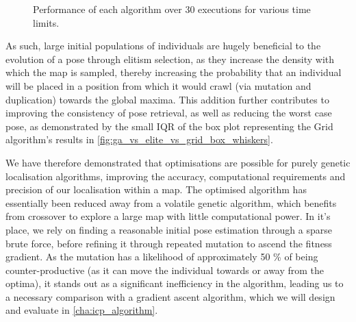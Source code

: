 \documentclass[authoryearcitations]{UoYCSproject}
\begin{document}
\begin{figure}
	\caption[Grid, Elitism, Benchmark time-adjusted performance.]{Performance of each algorithm over 30 executions for various time limits.}
	\label{fig:ga_vs_elite_vs_grid_box_whiskers}
\end{figure}

As such, large initial populations of individuals are hugely beneficial to the evolution of a pose through elitism selection, as they increase the density with which the map is sampled, thereby increasing the probability that an individual will be placed in a position from which it would crawl (via mutation and duplication) towards the global maxima. This addition further contributes to improving the consistency of pose retrieval, as well as reducing the worst case pose, as demonstrated by the small IQR of the box plot representing the Grid algorithm's results in \autoref{fig:ga_vs_elite_vs_grid_box_whiskers}. \newline

We have therefore demonstrated that optimisations are possible for purely genetic localisation algorithms, improving the accuracy, computational requirements and precision of our localisation within a map. The optimised algorithm has essentially been reduced away from a volatile genetic algorithm, which benefits from crossover to explore a large map with little computational power. In it's place, we rely on finding a reasonable initial pose estimation through a sparse brute force, before refining it through repeated mutation to ascend the fitness gradient. As the mutation has a likelihood of approximately 50 \% of being counter-productive (as it can move the individual towards or away from the optima), it stands out as a significant inefficiency in the algorithm, leading us to a necessary comparison with a gradient ascent algorithm, which we will design and evaluate in \autoref{cha:icp_algorithm}.
\end{document}
